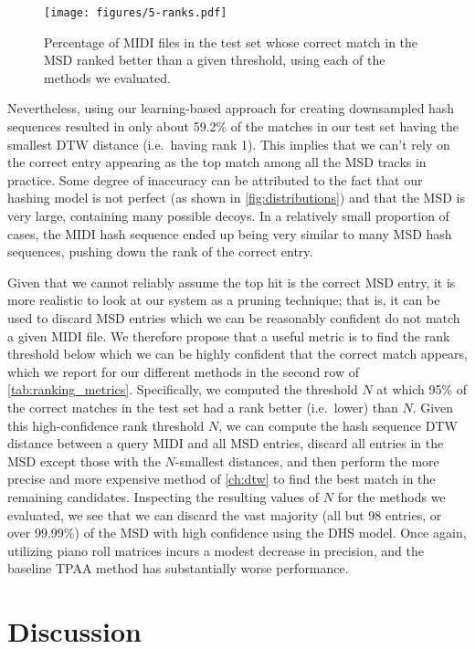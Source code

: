 \begin{figure}
  \texttt{[image: figures/5-ranks.pdf]}
  \caption[Percentage of the test set below a given rank]{Percentage of MIDI files in the test set whose correct match in the MSD ranked better than a given threshold, using each of the methods we evaluated.}
  \label{fig:ranks}
\end{figure}

Nevertheless, using our learning-based approach for creating downsampled hash sequences resulted in only about 59.2\% of the matches in our test set having the smallest DTW distance (i.e.\ having rank 1).
This implies that we can't rely on the correct entry appearing as the top match among all the MSD tracks in practice.
Some degree of inaccuracy can be attributed to the fact that our hashing model is not perfect (as shown in \cref{fig:distributions}) and that the MSD is very large, containing many possible decoys.
In a relatively small proportion of cases, the MIDI hash sequence ended up being very similar to many MSD hash sequences, pushing down the rank of the correct entry.

Given that we cannot reliably assume the top hit is the correct MSD entry, it is more realistic to look at our system as a pruning technique; that is, it can be used to discard MSD entries which we can be reasonably confident do not match a given MIDI file.
We therefore propose that a useful metric is to find the rank threshold below which we can be highly confident that the correct match appears, which we report for our different methods in the second row of \cref{tab:ranking_metrics}.
Specifically, we computed the threshold $N$ at which 95\% of the correct matches in the test set had a rank better (i.e.\ lower) than $N$.
Given this high-confidence rank threshold $N$, we can compute the hash sequence DTW distance between a query MIDI and all MSD entries, discard all entries in the MSD except those with the $N$-smallest distances, and then perform the more precise and more expensive method of \cref{ch:dtw} to find the best match in the remaining candidates.
Inspecting the resulting values of $N$ for the methods we evaluated, we see that we can discard the vast majority (all but 98 entries, or over 99.99\%) of the MSD with high confidence using the DHS model.
Once again, utilizing piano roll matrices incurs a modest decrease in precision, and the baseline TPAA method has substantially worse performance.

\section{Discussion}
\label{sec:dhs_discussion}

